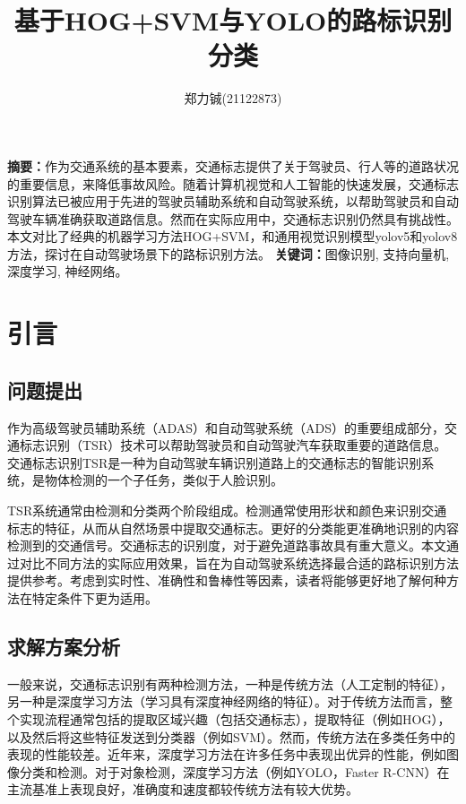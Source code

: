 \documentclass{article}
\title{\textbf{基于HOG+SVM与YOLO的路标识别分类}}
\author{
郑力铖(21122873)
}
\begin{document}
 \songti


\date{}
\maketitle


\begin{center}
    \setlength{\textwidth}{15cm}
    \parbox{\textwidth}{
        \textbf{摘要：}作为交通系统的基本要素，交通标志提供了关于驾驶员、行人等的道路状况的重要信息，来降低事故风险。随着计算机视觉和人工智能的快速发展，交通标志识别算法已被应用于先进的驾驶员辅助系统和自动驾驶系统，以帮助驾驶员和自动驾驶车辆准确获取道路信息。然而在实际应用中，交通标志识别仍然具有挑战性。本文对比了经典的机器学习方法HOG+SVM，和通用视觉识别模型yolov5和yolov8方法，探讨在自动驾驶场景下的路标识别方法。
        \newline
        \textbf{关键词：}图像识别, 支持向量机, 深度学习, 神经网络。
    }
\end{center}

\section{引言}
\subsection{问题提出}
作为高级驾驶员辅助系统（ADAS）和自动驾驶系统（ADS）的重要组成部分，交通标志识别（TSR）技术可以帮助驾驶员和自动驾驶汽车获取重要的道路信息\cite{chen2022realtime}。交通标志识别TSR是一种为自动驾驶车辆识别道路上的交通标志的智能识别系统，是物体检测的一个子任务，类似于人脸识别。

TSR系统通常由检测和分类两个阶段组成。检测通常使用形状和颜色来识别交通标志的特征，从而从自然场景中提取交通标志。更好的分类能更准确地识别的内容检测到的交通信号。交通标志的识别度，对于避免道路事故具有重大意义\cite{Zhang2017}。本文通过对比不同方法的实际应用效果，旨在为自动驾驶系统选择最合适的路标识别方法提供参考。考虑到实时性、准确性和鲁棒性等因素，读者将能够更好地了解何种方法在特定条件下更为适用。

\subsection{求解方案分析}
一般来说，交通标志识别有两种检测方法，一种是传统方法（人工定制的特征），另一种是深度学习方法（学习具有深度神经网络的特征）。对于传统方法而言，整个实现流程通常包括的提取区域兴趣（包括交通标志），提取特征（例如HOG），以及然后将这些特征发送到分类器（例如SVM）。然而，传统方法在多类任务中的表现的性能较差。近年来，深度学习方法在许多任务中表现出优异的性能，例如图像分类和检测。对于对象检测，深度学习方法（例如YOLO\cite{ref9}，Faster R-CNN\cite{Ren2016}）在主流基准上表现良好，准确度和速度都较传统方法有较大优势。
\end{document}
